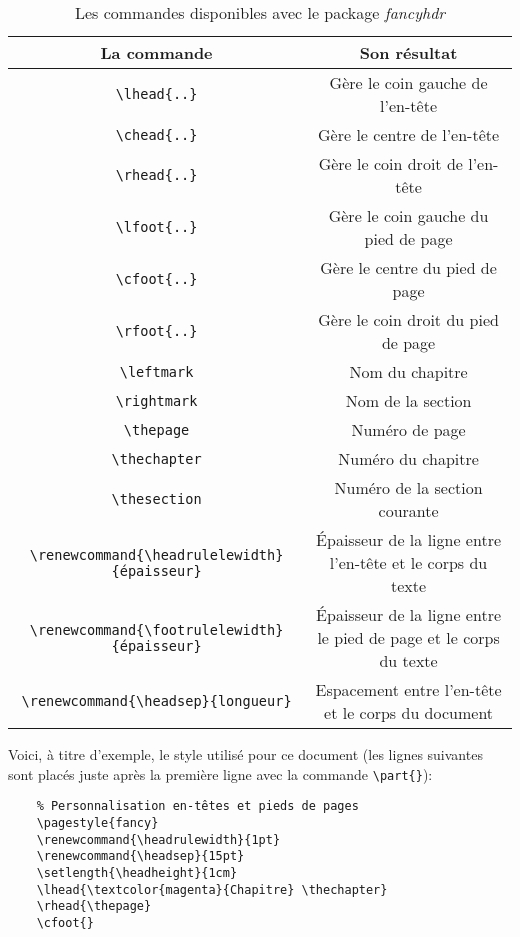 \documentclass[a4paper,11pt]{book}
\begin{document}
\begin{table}[h]
\begin{center}
\begin{tabular}{|c|c|}
\hline
\textbf{La commande} & \textbf{Son résultat} \\
\hline
\verb|\lhead{..}| & Gère le coin gauche de l'en-tête \\
\hline
\verb|\chead{..}| & Gère le centre de l'en-tête \\
\hline
\verb|\rhead{..}| & Gère le coin droit de l'en-tête \\
\hline
\verb|\lfoot{..}| & Gère le coin gauche du pied de page \\
\hline
\verb|\cfoot{..}| & Gère le centre du pied de page \\
\hline
\verb|\rfoot{..}| & Gère le coin droit du pied de page \\
\hline
\verb|\leftmark| & Nom du chapitre \\
\hline
\verb|\rightmark| & Nom de la section \\
\hline
\verb|\thepage| & Numéro de page \\
\hline
\verb|\thechapter| & Numéro du chapitre \\
\hline
\verb|\thesection| & Numéro de la section courante \\
\hline
\verb|\renewcommand{\headrulelewidth}{épaisseur}| & Épaisseur de la ligne entre l'en-tête et le corps du texte \\
\hline
\verb|\renewcommand{\footrulelewidth}{épaisseur}| & Épaisseur de la ligne entre le pied de page et le corps du texte \\
\hline
\verb|\renewcommand{\headsep}{longueur}| & Espacement entre l'en-tête et le corps du document \\
\hline
\end{tabular}
\caption{Les commandes disponibles avec le package \textit{fancyhdr}}
\end{center}
\end{table}
\medskip

Voici, à titre d'exemple, le style utilisé pour ce document (les lignes suivantes sont placés juste après la première ligne avec la commande \verb|\part{}|):
\begin{verbatim}
    % Personnalisation en-têtes et pieds de pages
    \pagestyle{fancy}
    \renewcommand{\headrulewidth}{1pt}
    \renewcommand{\headsep}{15pt}
    \setlength{\headheight}{1cm}
    \lhead{\textcolor{magenta}{Chapitre} \thechapter}
    \rhead{\thepage}
    \cfoot{}
\end{verbatim}
\medskip
\end{document}
